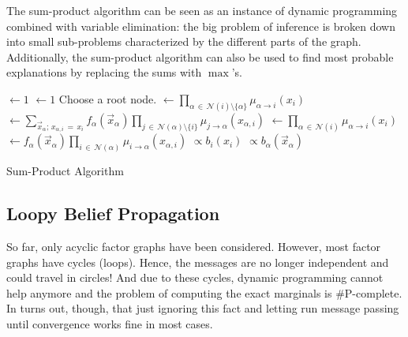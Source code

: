 		The sum-product algorithm can be seen as an instance of dynamic programming combined with variable elimination: the big problem of inference is broken down into small sub-problems characterized by the different parts of the graph. Additionally, the sum-product algorithm can also be used to find most probable explanations by replacing the sums with \(\max\)'s.

		\begin{algorithm}  \DontPrintSemicolon
			 \( \gets 1 \) \;
			\( \gets 1 \) \;
			Choose a root node. \;
			 \( \gets \prod_{\alpha \,\in\, \mathcal{N}(i) \setminus \{ \alpha \}} \mu_{\alpha \to i}(x_i) \) \;
			 \( \gets \sum_{\vec{x}_\alpha;\, x_{\alpha, i} \,=\, x_i} f_\alpha(\vec{x}_\alpha) \prod_{j \,\in\, \mathcal{N}(\alpha) \setminus \{ i \}} \mu_{j \to \alpha}(x_{\alpha, i}) \) \;
			 \( \gets \prod_{\alpha \,\in\, \mathcal{N}(i)} \mu_{\alpha \to i}(x_i) \) \;
			 \( \gets f_\alpha(\vec{x}_\alpha) \prod_{i \,\in\, \mathcal{N}(\alpha)} \mu_{i \to \alpha}(x_{\alpha, i}) \) \;
			 \( \propto b_i(x_i) \) \;
			 \( \propto b_\alpha(\vec{x}_\alpha) \) \;
			\caption{Sum-Product Algorithm}
			\label{alg:spa}
		\end{algorithm}


		\subsection{Loopy Belief Propagation}
			\label{subsec:loopyBelief}

			So far, only acyclic factor graphs have been considered. However, most factor graphs have cycles (loops). Hence, the messages are no longer independent and could travel in circles! And due to these cycles, dynamic programming cannot help anymore and the problem of computing the exact marginals is \#P-complete. In turns out, though, that just ignoring this fact and letting run message passing until convergence works fine in most cases.

